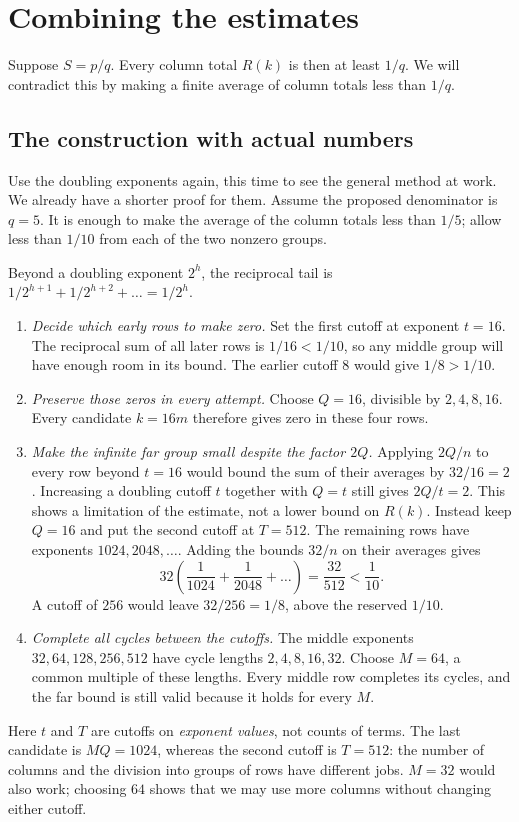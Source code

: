 \documentclass[10pt]{article}
\theoremstyle{plain}
\theoremstyle{definition}
\theoremstyle{remark}
\begin{document}
\section{Combining the estimates}\label{sec:proof}

Suppose $S=p/q$. Every column total $R(k)$ is then at least $1/q$.
We will contradict this by making a finite average of column totals
less than $1/q$.

\subsection{The construction with actual numbers}\label{app:numbers}

Use the doubling exponents again, this time to see the general method
at work. We already have a shorter proof for them. Assume the proposed
denominator is $q=5$. It is enough to make the average of the column totals
less than $1/5$; allow less than $1/10$ from each of the two nonzero groups.

Beyond a doubling exponent $2^h$, the reciprocal tail is
$1/2^{h+1}+1/2^{h+2}+\dots=1/2^h$.
\begin{enumerate}
\item \emph{Decide which early rows to make zero.}
 Set the first cutoff at exponent $t=16$. The reciprocal sum of all later
 rows is $1/16<1/10$, so any middle group will have enough room in its bound.
 The earlier cutoff $8$ would give $1/8>1/10$.
\item \emph{Preserve those zeros in every attempt.}
 Choose $Q=16$, divisible by $2,4,8,16$. Every candidate $k=16m$ therefore
 gives zero in these four rows.
\item \emph{Make the infinite far group small despite the factor $2Q$.}
 Applying $2Q/n$ to every row beyond $t=16$ would bound the sum of their
 averages by $32/16=2$. Increasing a doubling cutoff $t$ together with $Q=t$ still
 gives $2Q/t=2$. This shows a limitation of the estimate, not a lower
 bound on $R(k)$. Instead keep $Q=16$ and put the second cutoff at
 $T=512$. The remaining rows have exponents $1024,2048,\dots$.
 Adding the bounds $32/n$ on their averages gives
 \[
  32\left(\frac1{1024}+\frac1{2048}+\dots\right)
  =\frac{32}{512}<\frac1{10}.
 \]
 A cutoff of $256$ would leave $32/256=1/8$, above the reserved $1/10$.
\item \emph{Complete all cycles between the cutoffs.}
 The middle exponents $32,64,128,256,512$ have cycle lengths
 $2,4,8,16,32$. Choose $M=64$, a common multiple of these lengths.
 Every middle row completes its cycles, and the far bound is still valid
 because it holds for every $M$.
\end{enumerate}
Here $t$ and $T$ are cutoffs on \emph{exponent values}, not counts of terms.
The last candidate is $MQ=1024$, whereas the second cutoff is $T=512$:
the number of columns and the division into groups of rows have different jobs.
$M=32$ would also work; choosing $64$ shows that we may use more columns
without changing either cutoff.
\end{document}
